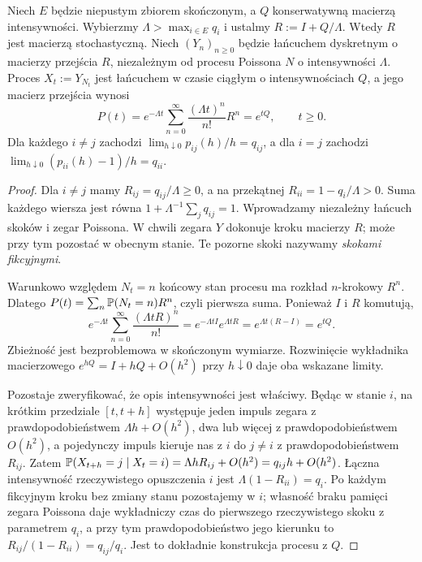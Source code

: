 \begin{twierdzenie}[Uniformizacja]
\label{thm:uniformization}
Niech $E$ będzie niepustym zbiorem skończonym,
a $Q$ konserwatywną macierzą intensywności.
Wybierzmy $\Lambda>\max_{i\in E}q_i$ i ustalmy
$R:=I+Q/\Lambda$. Wtedy $R$ jest macierzą stochastyczną.
Niech $(Y_n)_{n\ge0}$ będzie łańcuchem dyskretnym o macierzy
przejścia $R$, niezależnym od procesu Poissona $N$ o intensywności
$\Lambda$. Proces $X_t:=Y_{N_t}$ jest łańcuchem w czasie
ciągłym o intensywnościach $Q$, a jego macierz przejścia wynosi
\[
P(t)=e^{-\Lambda t}\sum_{n=0}^\infty
\frac{(\Lambda t)^n}{n!}R^n=e^{tQ},\qquad t\ge0.
\]
Dla każdego $i\ne j$ zachodzi
$\lim_{h\downarrow0}p_{ij}(h)/h=q_{ij}$,
a dla $i=j$ zachodzi
$\lim_{h\downarrow0}(p_{ii}(h)-1)/h=q_{ii}$.
\end{twierdzenie}
\begin{proof}
Dla $i\ne j$ mamy $R_{ij}=q_{ij}/\Lambda\ge0$,
a na przekątnej $R_{ii}=1-q_i/\Lambda>0$.
Suma każdego wiersza jest równa
$1+\Lambda^{-1}\sum_j q_{ij}=1$.
Wprowadzamy niezależny łańcuch skoków i zegar Poissona.
W chwili zegara $Y$ dokonuje kroku macierzy $R$; może
przy tym pozostać w obecnym stanie. Te pozorne skoki
nazywamy \emph{skokami fikcyjnymi}.

Warunkowo względem $N_t=n$ końcowy stan procesu ma
rozkład $n$-krokowy $R^n$. Dlatego
$P(t)=\sum_n\mathbb{P}(N_t=n)R^n$, czyli pierwsza suma.
Ponieważ $I$ i $R$ komutują,
\[
e^{-\Lambda t}\sum_{n=0}^\infty\frac{(\Lambda tR)^n}{n!}
=e^{-\Lambda t I}e^{\Lambda tR}
=e^{\Lambda t(R-I)}=e^{tQ}.
\]
Zbieżność jest bezproblemowa w skończonym wymiarze.
Rozwinięcie wykładnika macierzowego
$e^{hQ}=I+hQ+O(h^2)$ przy $h\downarrow0$
daje oba wskazane limity.

Pozostaje zweryfikować, że opis intensywności jest właściwy.
Będąc w stanie $i$, na krótkim przedziale $[t,t+h]$
występuje jeden impuls zegara z prawdopodobieństwem
$\Lambda h+O(h^2)$, dwa lub więcej z prawdopodobieństwem
$O(h^2)$, a pojedynczy impuls kieruje nas z $i$ do $j\ne i$
z prawdopodobieństwem $R_{ij}$. Zatem
$\mathbb{P}(X_{t+h}=j\mid X_t=i)=\Lambda hR_{ij}+O(h^2)
=q_{ij}h+O(h^2)$.
Łączna intensywność rzeczywistego opuszczenia $i$ jest
$\Lambda(1-R_{ii})=q_i$. Po każdym fikcyjnym kroku bez
zmiany stanu pozostajemy w $i$; własność braku pamięci
zegara Poissona daje wykładniczy czas do pierwszego
rzeczywistego skoku z parametrem $q_i$, a przy tym
prawdopodobieństwo jego kierunku to
$R_{ij}/(1-R_{ii})=q_{ij}/q_i$.
Jest to dokładnie konstrukcja procesu z $Q$.
\end{proof}


